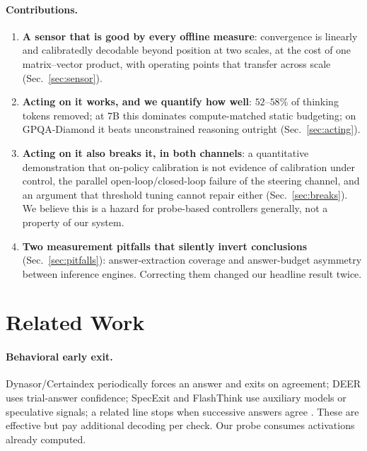 \paragraph{Contributions.}
\begin{enumerate}
\itemsep2pt
\item \textbf{A sensor that is good by every offline measure}: convergence is
linearly and calibratedly decodable beyond position at two scales, at the cost
of one matrix--vector product, with operating points that transfer across
scale (Sec.~\ref{sec:sensor}).
\item \textbf{Acting on it works, and we quantify how well}: $52$--$58\%$ of
thinking tokens removed; at 7B this dominates compute-matched static
budgeting; on GPQA-Diamond it beats unconstrained reasoning outright
(Sec.~\ref{sec:acting}).
\item \textbf{Acting on it also breaks it, in both channels}: a quantitative
demonstration that on-policy calibration is not evidence of calibration under
control, the parallel open-loop/closed-loop failure of the steering channel,
and an argument that threshold tuning cannot repair either
(Sec.~\ref{sec:breaks}). We believe this is a hazard for probe-based
controllers generally, not a property of our system.
\item \textbf{Two measurement pitfalls that silently invert conclusions}
(Sec.~\ref{sec:pitfalls}): answer-extraction coverage and answer-budget
asymmetry between inference engines. Correcting them changed our headline
result twice.
\end{enumerate}

\section{Related Work}

\paragraph{Behavioral early exit.} Dynasor/Certaindex \cite{dynasor}
periodically forces an answer and exits on agreement; DEER \cite{deer}
uses trial-answer confidence; SpecExit \cite{specexit} and FlashThink
\cite{flashthink} use auxiliary models or speculative signals; a related line
stops when successive answers agree \cite{answerconv}. These are effective but
pay additional decoding per check. Our probe consumes activations already
computed.

